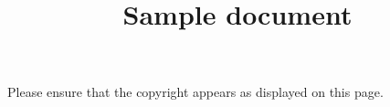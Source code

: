 \documentclass[sigconf,edbt]{acmart-edbt2021}
\title{Sample document}
\begin{document}
\maketitle

Please ensure that the copyright appears as displayed on this page.
\end{document}
